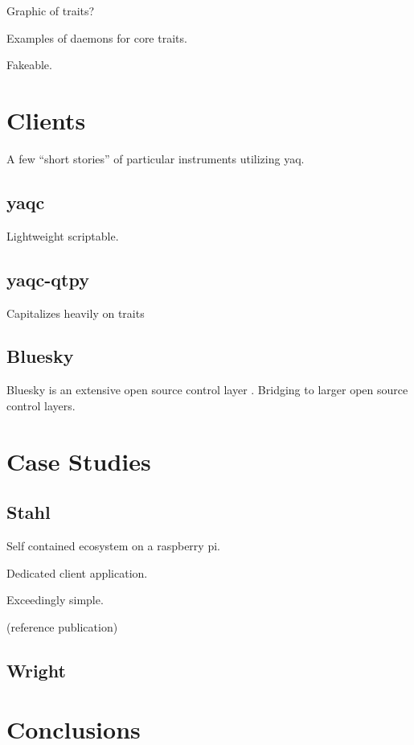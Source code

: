 \documentclass{article}
\begin{document}
Graphic of traits?

Examples of daemons for core traits.

Fakeable.

\section{Clients}

A few ``short stories'' of particular instruments utilizing yaq.

\subsection{yaqc}

Lightweight scriptable.

\subsection{yaqc-qtpy}

Capitalizes heavily on traits

\subsection{Bluesky}

Bluesky is an extensive open source control layer \cite{AllanDanielB2019a}.
Bridging to larger open source control layers.

\section{Case Studies}

\subsection{Stahl}

Self contained ecosystem on a raspberry pi.

Dedicated client application.

Exceedingly simple.

(reference publication)

\subsection{Wright}

\section{Conclusions}

\clearpage


\end{document}
